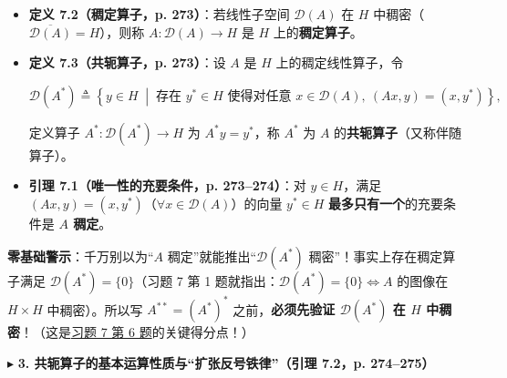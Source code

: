 \documentclass[11pt,a4paper]{article}
\providecommand{\tightlist}{\setlength{\itemsep}{2pt}\setlength{\parskip}{0pt}}
\newcommand{\SubSubHeading}[1]{%
  \Needspace{6.5\baselineskip}\vspace{5.5pt}\noindent
  \textcolor{AccentMain}{\scriptsize$\blacktriangleright$}\hspace{4pt}%
  {\small\bfseries\color{AccentMain}#1}\par\nopagebreak[4]\vspace{2.5pt}%
}
\renewenvironment{quote}{%
  \begin{tcolorbox}[
    enhanced,
    breakable,
    colback=AccentSoft!48!white,
    colframe=AccentMain,
    boxrule=0pt,
    leftrule=2.8pt,
    arc=2.5pt,
    left=9pt, right=8pt, top=6pt, bottom=6pt,
    before skip=5.5pt, after skip=5.5pt
  ]\small
}{%
  \end{tcolorbox}%
}
\newcommand{\FitDisplayMath}[1]{%
  \par\vspace{4.5pt}\noindent
  \begin{adjustbox}{max width=\linewidth, center}
    $\displaystyle #1$
  \end{adjustbox}
  \par\vspace{4.5pt}%
}
\begin{document}
\begin{itemize}
\tightlist
\item
  \textbf{定义 7.2（稠定算子，p. 273）}：若线性子空间 \(\mathcal{D}(A)\) 在 \(H\) 中稠密（\(\overline{\mathcal{D}(A)} = H\)），则称 \(A: \mathcal{D}(A) \to H\) 是 \(H\) 上的\textbf{稠定算子}。
\item
  \textbf{定义 7.3（共轭算子，p. 273）}：设 \(A\) 是 \(H\) 上的稠定线性算子，令 
\FitDisplayMath{\mathcal{D}(A^*) \triangleq \left\{y \in H \;\middle|\; \text{存在 } y^* \in H \text{ 使得对任意 } x \in \mathcal{D}(A),\ (Ax, y) = (x, y^*)\right\},}
 定义算子 \(A^*: \mathcal{D}(A^*) \to H\) 为 \(A^* y = y^*\)，称 \(A^*\) 为 \(A\) 的\textbf{共轭算子}（又称伴随算子）。
\item
  \textbf{引理 7.1（唯一性的充要条件，p. 273--274）}：对 \(y \in H\)，满足 \((Ax, y) = (x, y^*)\)（\(\forall x \in \mathcal{D}(A)\)）的向量 \(y^* \in H\) \textbf{最多只有一个}的充要条件是 \textbf{\(A\) 稠定}。
\end{itemize}

\begin{quote}
\textbf{零基础警示}：千万别以为``\(A\) 稠定''就能推出``\(\mathcal{D}(A^*)\) 稠密''！事实上存在稠定算子满足 \(\mathcal{D}(A^*) = \{0\}\)（习题 7 第 1 题就指出：\(\mathcal{D}(A^*) = \{0\} \iff A\) 的图像在 \(H \times H\) 中稠密）。所以写 \(A^{**} = (A^*)^*\) 之前，\textbf{必须先验证 \(\mathcal{D}(A^*)\) 在 \(H\) 中稠密}！（这是\hyperlink{prob:7-6}{\textcolor{LinkColor}{习题 7 第 6 题}}的关键得分点！）
\end{quote}

\SubSubHeading{3. 共轭算子的基本运算性质与``扩张反号铁律''（引理 7.2，p. 274--275）}
\end{document}
